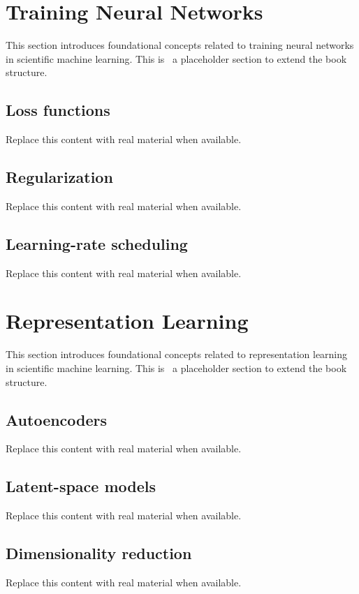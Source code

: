 \section{Training Neural Networks}
This section introduces foundational concepts related to training neural networks in scientific machine learning. This is~\cite{abdulmaksoudTransformerBasedSensorFusion2025} a placeholder section to extend the book structure.

\subsection{Loss functions}
Replace this content with real material when available.

\subsection{Regularization}
Replace this content with real material when available.

\subsection{Learning-rate scheduling}
Replace this content with real material when available.

\section{Representation Learning}
This section introduces foundational concepts related to representation learning in scientific machine learning. This is~\cite{abdulmaksoudTransformerBasedSensorFusion2025} a placeholder section to extend the book structure.

\subsection{Autoencoders}
Replace this content with real material when available.

\subsection{Latent-space models}
Replace this content with real material when available.

\subsection{Dimensionality reduction}
Replace this content with real material when available.
